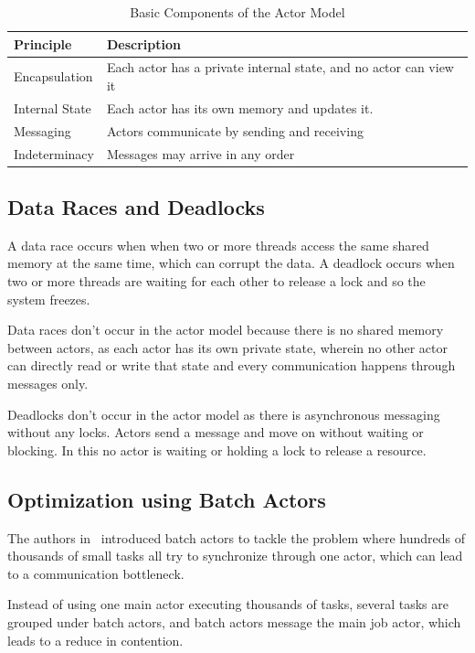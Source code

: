 \begin{table}[H]
    \centering
    \caption{Basic Components of the Actor Model}
    \label{tab:actor_model}
    \begin{tabularx}{\textwidth}{|l|X|}
        \hline
        \textbf{Principle} & \textbf{Description} \\
        \hline
        Encapsulation & Each actor has a private internal state, and no actor can view it \\
        \hline
        Internal State & Each actor has its own memory and updates it. \\
        \hline
        Messaging & Actors communicate by sending and receiving \\
        \hline
        Indeterminacy & Messages may arrive in any order \\
        \hline
        
    \end{tabularx}
\end{table}

\subsection{Data Races and Deadlocks}
A data race occurs when when two or more threads access the same shared memory at the same time, which can corrupt the data. A deadlock occurs when two or more threads are waiting for each other to release a lock and so the system freezes. 

Data races don't occur in the actor model because there is no shared memory between actors, as each actor has its own private state, wherein no other actor can directly read or write that state and every communication happens through messages only. 

Deadlocks don't occur in the actor model as there is asynchronous messaging without any locks. Actors send a message and move on without waiting or blocking. In this no actor is waiting or holding a lock to release a resource.

\subsection{Optimization using Batch Actors}
The authors in~\cite{10820772} introduced batch actors to tackle the problem where hundreds of thousands of small tasks all try to synchronize through one actor, which can lead to a communication bottleneck.

Instead of using one main actor executing thousands of tasks, several tasks are grouped under batch actors, and batch actors message the main job actor, which leads to a reduce in contention. 

